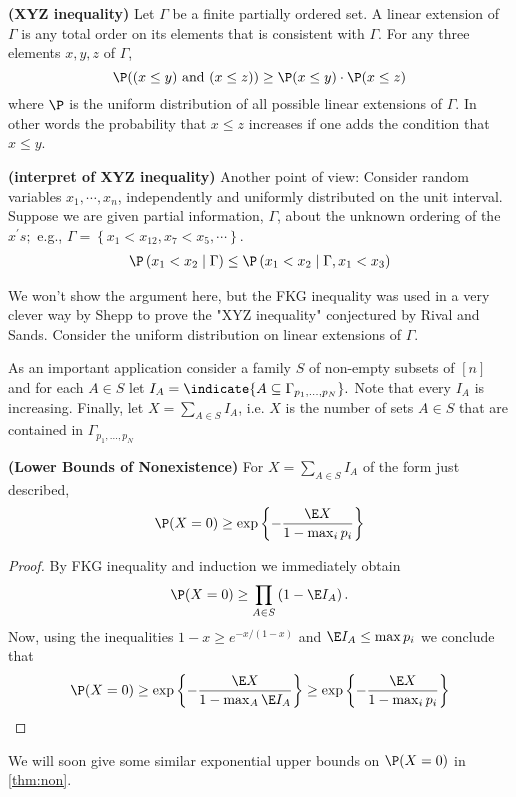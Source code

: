 \documentclass{article}
\newcommand{\bfs}[1]{\textbf{({#1})}}
\begin{document}
\begin{cora}{\bfs{XYZ inequality}}
Let $\Gamma$ be a finite  partially ordered set. A linear extension of $\Gamma$ is any total order on its elements that is consistent with $\Gamma$. For any three elements $x, y, z$ of $\Gamma$,
$$
\P((x \leq y) \text{ and } (x \leq z)) \geq \P(x \leq y) \cdot \P(x \leq z)
$$
where $\P$ is the uniform distribution of all possible linear extensions of $\Gamma$. In other words the probability that  $x\le z$ increases if one adds the condition that $x\le y$.
\end{cora}
\begin{rema}{\bfs{interpret of XYZ inequality}}
Another point of view: Consider random variables $x_{1}, \cdots, x_{n}$, independently and uniformly distributed on the unit interval. Suppose we are given partial information, $\Gamma$, about the unknown ordering of the $x^{\prime} s ;$ e.g., $\Gamma=\left\{x_{1}<x_{12}, x_{7}<x_{5}, \cdots\right\} .$ 
\begin{align*}
\P\left(x_{1}<x_{2} \mid \Gamma\right) \leq \P\left(x_{1}<x_{2} \mid \Gamma, x_{1}<x_{3}\right)
\end{align*}
\end{rema}
We won't show the argument here, but the FKG inequality was used in a very clever way by Shepp to prove the "XYZ inequality" conjectured by Rival and Sands.  Consider the uniform distribution on linear extensions of $\Gamma$.



As an important application consider a family $S$ of non-empty subsets of $[n]$ and for each $A \in S$ let $I_{A}=\indicate{A \subseteq \Gamma_{p_{1}, \ldots, p_{N}}}.$ Note that every $I_{A}$ is increasing. Finally, let $X=\sum_{A \in S } I_{A}$, i.e. $X$ is the number of sets $A \in S$ that are contained in $\Gamma_{p_{1}, \ldots, p_{N}}$
\begin{cora}{\bfs{Lower Bounds of Nonexistence}}\label{cora:non}
For $X=\sum_{A \in S } I_{A}$ of the form just described,
$$
\P (X=0) \geq \exp \left\{-\frac{ \E X}{1-\max _{i} p_{i}}\right\}
$$
\end{cora}
\begin{proof}
By FKG inequality and induction we immediately obtain
$$
\P (X=0) \geq \prod_{A \in S }\left(1- \E I_{A}\right) .
$$
Now, using the inequalities $1-x \geq e^{-x /(1-x)}$ and $\E I_{A} \leq \max p_{i}$ we conclude that
$$
\P (X=0) \geq \exp \left\{-\frac{ \E X}{1-\max _{A} \E I_{A}}\right\} \geq \exp \left\{-\frac{ \E X}{1-\max _{i} p_{i}}\right\}
$$
\end{proof} 
\begin{rema}
We will soon give some similar exponential upper bounds on $\P (X=0)$ in \cref{thm:non}.
\end{rema}
\end{document}
